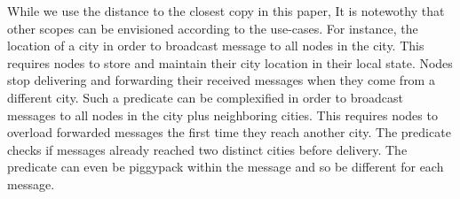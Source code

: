 

While we use the distance to the closest copy in this paper, It is
notewothy that other scopes can be envisioned according to the
use-cases.  For instance, the location of a city in order to broadcast
message to all nodes in the city.  This requires nodes to store and
maintain their city location in their local state. Nodes stop
delivering and forwarding their received messages when they come from
a different city. Such a predicate can be complexified in order to
broadcast messages to all nodes in the city plus neighboring
cities. This requires nodes to overload forwarded messages the first
time they reach another city. The predicate checks if messages already
reached two distinct cities before delivery.  The predicate can even
be piggypack within the message and so be different for each
message.



